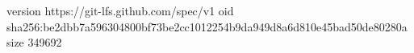 version https://git-lfs.github.com/spec/v1
oid sha256:be2dbb7a596304800bf73be2cc1012254b9da949d8a6d810e45bad50de80280a
size 349692
